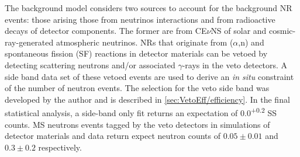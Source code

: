 The background model considers two sources to account for the background NR events: those arising those from neutrinos interactions and from radioactive decays of detector components. The former are from CE$\nu$NS of solar and cosmic-ray-generated atmospheric neutrinos. NRs that originate from ($\alpha$,n) and spontaneous fission (SF) reactions in detector materials can be vetoed by detecting scattering neutrons and/or associated $\gamma$-rays in the veto detectors. A side band data set of these vetoed events are used to derive an \textit{in situ} constraint of the number of neutron events. The selection for the veto side band was developed by the author and is described in \autoref{sec:VetoEff/efficiency}.
In the final statistical analysis, a side-band only fit returns an expectation of 0.0\textsuperscript{+0.2} SS counts. MS neutrons events tagged by the veto detectors in simulations of detector materials and data return expect neutron counts of $0.05\pm0.01$ and $0.3\pm0.2$ respectively.

